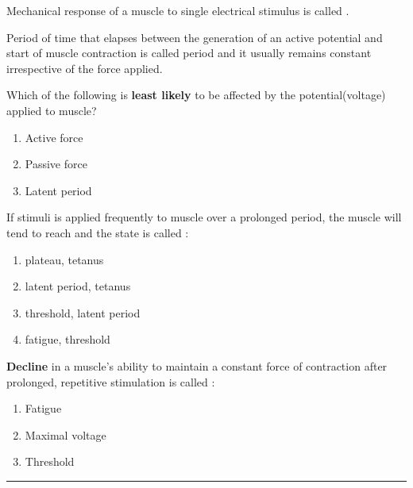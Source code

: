 \documentclass[11pt,paper=a4,answers]{exam}
\begin{document}
\begin{questions}

\pointsinrightmargin
\pointsdroppedatright
\marksnotpoints
\pointformat{\boldmath\themarginpoints}
\bracketedpoints
\question[01]
\label{Q:perunit}
Mechanical response of a muscle to single electrical stimulus is called \underline{\hspace{3cm}}.
\droppoints

\question[01]
Period of time that elapses between the generation of an active potential and start of muscle contraction is called \underline{\hspace{3cm}} period and it usually remains constant irrespective of the force applied.
\droppoints

\question[01]
Which of the following is \textbf{least likely} to be affected by the potential(voltage) applied to muscle?
\droppoints

\begin{enumerate}[label=\alph*]
\item Active force
\item Passive force
\item Latent period
\end{enumerate}

\question[02]
If stimuli is applied frequently to muscle over a prolonged period, the muscle will
tend to reach \underline{\hspace{3cm}} and the state is called \underline{\hspace{3cm}}:
\droppoints

\begin{enumerate}[label=\alph*]
\item plateau, tetanus
\item latent period, tetanus
\item threshold, latent period
\item fatigue, threshold
\end{enumerate}


\question[02]
\textbf{Decline} in a muscle's ability to maintain a constant force of contraction after prolonged, repetitive stimulation is called :
\droppoints

\begin{enumerate}[label=\alph*]
\item Fatigue
\item Maximal voltage
\item Threshold
\end{enumerate}


 
\end{questions}
\begin{center}
\rule{\textwidth}{1pt}
\end{center}
\end{document}
